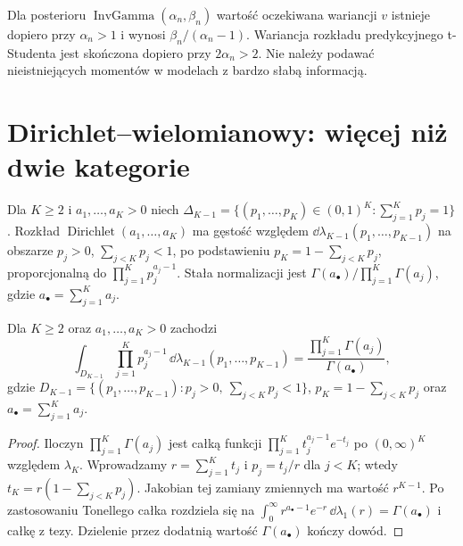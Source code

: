 \begin{uwaga}
Dla posterioru $\operatorname{InvGamma}(\alpha_n,\beta_n)$
wartość oczekiwana wariancji $v$ istnieje dopiero przy
$\alpha_n>1$ i wynosi $\beta_n/(\alpha_n-1)$.
Wariancja rozkładu predykcyjnego t-Studenta jest skończona
dopiero przy $2\alpha_n>2$. Nie należy podawać nieistniejących
momentów w modelach z bardzo słabą informacją.
\end{uwaga}

\section{Dirichlet--wielomianowy: więcej niż dwie kategorie}
\begin{definicja}
Dla $K\ge2$ i $a_1,\ldots,a_K>0$ niech
$\Delta_{K-1}=\{(p_1,\ldots,p_K)\in(0,1)^K:\sum_{j=1}^Kp_j=1\}$.
Rozkład $\operatorname{Dirichlet}(a_1,\ldots,a_K)$ ma
gęstość względem $\dd\lambda_{K-1}(p_1,\ldots,p_{K-1})$
na obszarze $p_j>0$, $\sum_{j<K}p_j<1$, po podstawieniu
$p_K=1-\sum_{j<K}p_j$, proporcjonalną do
$\prod_{j=1}^Kp_j^{a_j-1}$. Stała normalizacji jest
$\Gamma(a_\bullet)/\prod_{j=1}^K\Gamma(a_j)$,
gdzie $a_\bullet=\sum_{j=1}^Ka_j$.
\end{definicja}

\begin{lemat}
Dla $K\ge2$ oraz $a_1,\ldots,a_K>0$ zachodzi
\[
 \int_{D_{K-1}}\prod_{j=1}^{K}p_j^{a_j-1}
 \,\dd\lambda_{K-1}(p_1,\ldots,p_{K-1})
 =\frac{\prod_{j=1}^K\Gamma(a_j)}{\Gamma(a_\bullet)},
\]
gdzie $D_{K-1}=\{(p_1,\ldots,p_{K-1}):p_j>0,
\ \sum_{j<K}p_j<1\}$, $p_K=1-\sum_{j<K}p_j$ oraz
$a_\bullet=\sum_{j=1}^Ka_j$.
\end{lemat}
\begin{proof}
Iloczyn $\prod_{j=1}^K\Gamma(a_j)$ jest całką funkcji
$\prod_{j=1}^Kt_j^{a_j-1}e^{-t_j}$ po $(0,\infty)^K$
względem $\lambda_K$. Wprowadzamy
$r=\sum_{j=1}^Kt_j$ i $p_j=t_j/r$ dla $j<K$;
wtedy $t_K=r(1-\sum_{j<K}p_j)$.
Jakobian tej zamiany zmiennych ma wartość $r^{K-1}$.
Po zastosowaniu Tonellego całka rozdziela się na
$\int_0^\infty r^{a_\bullet-1}e^{-r}\,\dd\lambda_1(r)
=\Gamma(a_\bullet)$ i całkę z tezy. Dzielenie
przez dodatnią wartość $\Gamma(a_\bullet)$ kończy dowód.
\end{proof}

